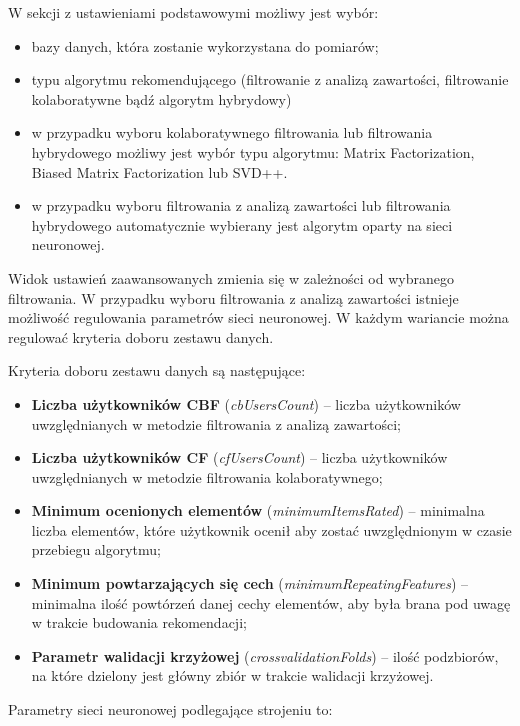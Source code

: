 \documentclass[twoside]{iisthesis}
\begin{document}
		W sekcji z ustawieniami podstawowymi możliwy jest wybór:
		\begin{itemize}
			\item bazy danych, która zostanie wykorzystana do pomiarów;
			\item typu algorytmu rekomendującego (filtrowanie z analizą zawartości, filtrowanie kolaboratywne bądź algorytm hybrydowy)
			\item w przypadku wyboru kolaboratywnego filtrowania lub filtrowania hybrydowego możliwy jest wybór typu algorytmu: Matrix Factorization, Biased Matrix Factorization lub SVD++.
			\item w przypadku wyboru filtrowania z analizą zawartości lub filtrowania hybrydowego automatycznie wybierany jest algorytm oparty na sieci neuronowej. 
		\end{itemize}
		 
		 Widok ustawień zaawansowanych zmienia się w zależności od wybranego filtrowania. W przypadku wyboru filtrowania z analizą zawartości istnieje możliwość regulowania parametrów sieci neuronowej. W każdym wariancie można regulować kryteria doboru zestawu danych.
		 
		 Kryteria doboru zestawu danych są następujące:
		 
		 \begin{itemize}
		 	\item \textbf{Liczba użytkowników CBF} (\textit{cbUsersCount}) -- liczba użytkowników uwzględnianych w metodzie filtrowania z analizą zawartości;
		 	\item \textbf{Liczba użytkowników CF} (\textit{cfUsersCount}) -- liczba użytkowników uwzględnianych w metodzie filtrowania kolaboratywnego;
		 	\item \textbf{Minimum ocenionych elementów} (\textit{minimumItemsRated}) -- minimalna liczba elementów, które użytkownik ocenił aby zostać uwzględnionym w czasie przebiegu algorytmu;
		 	\item \textbf{Minimum powtarzających się cech} (\textit{minimumRepeatingFeatures}) -- minimalna ilość powtórzeń danej cechy elementów, aby była brana pod uwagę w trakcie budowania rekomendacji;
		 	\item \textbf{Parametr walidacji krzyżowej} (\textit{crossvalidationFolds}) -- ilość podzbiorów, na które dzielony jest główny zbiór w trakcie walidacji krzyżowej. 
		 \end{itemize}
		 
		 Parametry sieci neuronowej podlegające strojeniu to:
\end{document}
